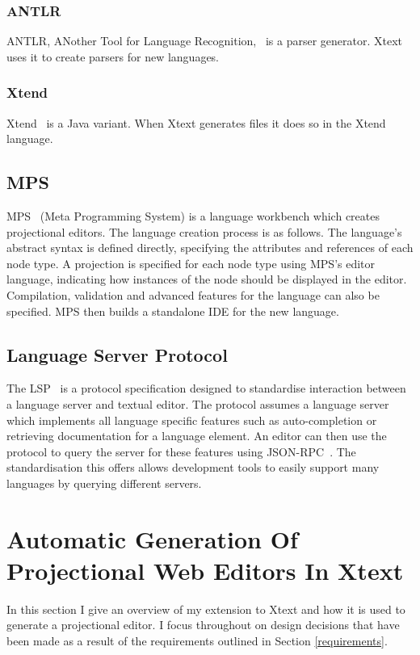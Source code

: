 \documentclass{article}
\begin{document}
\subsubsection{ANTLR}
ANTLR, ANother Tool for Language Recognition,~\cite{antlr} is a parser generator. Xtext uses it to create parsers for new languages.
\subsubsection{Xtend}
Xtend~\cite{xtend} is a Java variant. When Xtext generates files it does so in the Xtend language.
\subsection{MPS}\label{mps}
MPS~\cite{mps} (Meta Programming System) is a language workbench which creates projectional editors. The language creation process is as follows. The language's abstract syntax is defined directly, specifying the attributes and references of each node type. A projection is specified for each node type using MPS's editor language, indicating how instances of the node should be displayed in the editor. Compilation, validation and advanced features for the language can also be specified. MPS then builds a standalone IDE for the new language. 
\subsection{Language Server Protocol}\label{lsp}
The LSP~\cite{lsp} is a protocol specification designed to standardise interaction between a language server and textual editor. The protocol assumes a language server which implements all language specific features such as auto-completion or retrieving documentation for a language element. An editor can then use the protocol to query the server for these features using JSON-RPC~\cite{jsonrpc}. The standardisation this offers allows development tools to easily support many languages by querying different servers.
%
%
%
%
%
%
\section{Automatic Generation Of Projectional Web Editors In Xtext}\label{generation}
In this section I give an overview of my extension to Xtext and how it is used to generate a projectional editor. I focus throughout on design decisions that have been made as a result of the requirements outlined in Section \ref{requirements}. 
\end{document}
